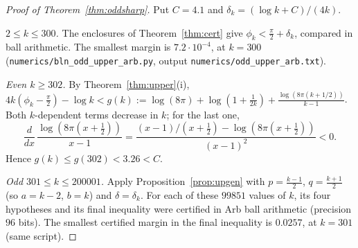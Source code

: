 \documentclass[11pt]{amsart}
\theoremstyle{definition}
\begin{document}
\begin{proof}[Proof of Theorem~\ref{thm:oddsharp}]
Put $C=4.1$ and $\delta_k=(\log k+C)/(4k)$.

\emph{$2\le k\le300$.} The enclosures of Theorem~\ref{thm:cert} give $\phi_k<\frac\pi2+\delta_k$, compared in ball arithmetic. The smallest
margin is $7.2\cdot10^{-4}$, at $k=300$ (\texttt{numerics/bln\_odd\_upper\_arb.py}, output \texttt{numerics/odd\_upper\_arb.txt}).

\emph{Even $k\ge302$.} By Theorem~\ref{thm:upper}(i), $4k(\phi_k-\frac\pi2)-\log k<g(k):=\log(8\pi)+\log(1+\frac1{2k})+\frac{\log(8\pi(k+1/2))}{k-1}$.
Both $k$-dependent terms decrease in $k$; for the last one,
\[
\frac{d}{dx}\,\frac{\log(8\pi(x+\frac12))}{x-1}=\frac{(x-1)/(x+\frac12)-\log(8\pi(x+\frac12))}{(x-1)^2}<0 .
\]
Hence $g(k)\le g(302)<3.26<C$.

\emph{Odd $301\le k\le200001$.} Apply Proposition~\ref{prop:upgen} with $p=\frac{k-1}2$, $q=\frac{k+1}2$ (so $a=k-2$, $b=k$) and $\delta=\delta_k$.
For each of these $99851$ values of $k$, its four hypotheses and its final inequality were certified in Arb ball arithmetic (precision $96$
bits). The smallest certified margin in the final inequality is $0.0257$, at $k=301$ (same script).


\end{proof}
\end{document}
